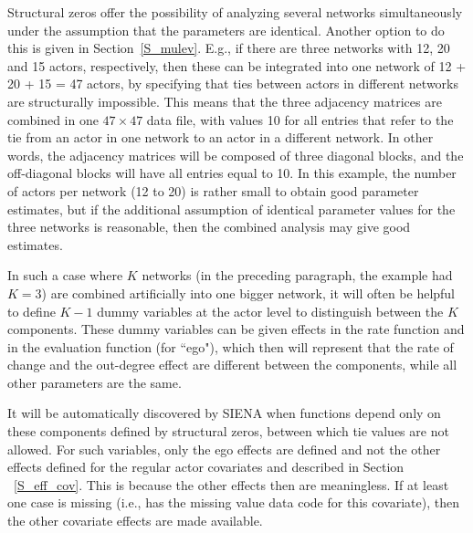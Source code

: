 \documentclass[a4paper,fleqn]{article}
\newcommand{\+}{\, + \,}
\newcommand{\SI}{{\sf SIENA }}
\begin{document}
{Structural zeros offer the possibility of analyzing several
networks simultaneously under the assumption that the parameters
are identical.
Another option to do this is given in Section~\ref{S_mulev}.
E.g., if there are three networks with 12, 20 and
15 actors, respectively, then these can be integrated into one
network of 12 + 20 + 15 = 47 actors, by specifying that ties
between actors in different networks are structurally impossible.
This means that the three adjacency matrices are combined in one
$47 \times 47$ data file, with values 10 for all entries that
refer to the tie from an actor in one network to an actor in a
different network. In other words, the adjacency matrices will be
composed of three diagonal blocks, and the off-diagonal blocks
will have all entries equal to 10. In this example, the number of
actors per network (12 to 20) is rather small to obtain good
parameter estimates, but if the additional assumption of identical
parameter values for the three networks is reasonable, then the
combined analysis may give good estimates.

In such a case where $K$ networks (in the preceding paragraph, the
example had $K = 3$) are combined artificially into one bigger
network, it will often be helpful to define $K-1$ dummy variables
at the actor level to distinguish between the $K$ components.
These dummy variables can be given effects in the rate function
and in the evaluation function (for ``ego"), which then will
represent that the rate of change and the out-degree effect are
different between the components, while all other parameters are
the same.

It will be automatically discovered by \SI when functions
depend only on these components defined by structural zeros,
between which tie values are not allowed.
For such variables, only the ego effects are defined
and not the other effects defined for the regular
actor covariates and described in Section ~\ref{S_eff_cov}.
This is because the other effects then are meaningless.
If at least one case is missing (i.e., has the missing value data code
for this covariate),
then the other covariate effects are made available.

}
\end{document}
